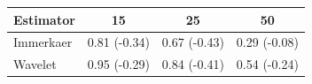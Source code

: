 \begin{tabular}{lccc}
\toprule
Estimator & 15 & 25 & 50 \\
\midrule
Immerkaer & 0.81 (-0.34) & 0.67 (-0.43) & 0.29 (-0.08) \\
Wavelet & 0.95 (-0.29) & 0.84 (-0.41) & 0.54 (-0.24) \\
\bottomrule
\end{tabular}
